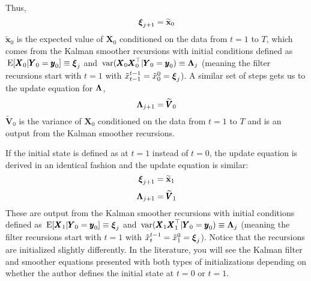 \documentclass[]{article}
\def\xixi{\mbox{\boldmath $\xi$}}
\def\LAM{\mbox{\boldmath $\Lambda$}}
\def\VV{\mbox{$\pmb{V}$}}	\def\vv{\mbox{$\pmb{v}$}}
\def\XX{\mbox{$\pmb{X}$}}	\def\xx{\mbox{$\pmb{x}$}}
\def\YY{\mbox{$\pmb{Y}$}}	\def\yy{\mbox{$\pmb{y}$}}
\def\E{\,\textup{\textrm{E}}}
\def\var{\,\textup{\textrm{var}}}
\begin{document}
Thus,
\begin{equation}\label{eq:pi.update.unconstrained}
\xixi_{j+1} = \widetilde{\mbox{$\mathbf x$}}_0
\end{equation}
$\widetilde{\mbox{$\mathbf x$}}_0$ is the expected value of $\XX_0$ conditioned on the data from $t=1$ to $T$, which comes from the Kalman smoother recursions with initial conditions defined as $\E[\XX_0|\YY_0=\yy_0] \equiv \xixi_j$ and $\var(\XX_0 \XX_0^\top|\YY_0=\yy_0)\equiv \LAM_j$ (meaning the filter recursions start with $t=1$ with  $\tilde{x}_{t-1}^{t-1} = \tilde{x}_0^0 = \xixi_j$).
A similar set of steps gets us to the update equation for $\LAM$,
\begin{equation}\label{eq:V0.update.unconstrained}
\LAM_{j+1} = \widetilde{\VV}_0
\end{equation}
$\widetilde{\VV}_0$ is the variance of $\XX_0$ conditioned on the data from $t=1$ to $T$ and is an output from the Kalman smoother recursions.

If the initial state is defined as at $t=1$ instead of $t=0$, the update equation is derived in an identical fashion and the update equation is similar:
\begin{equation}\label{eq:pix1.update.unconstrained}
\xixi_{j+1} = \widetilde{\mbox{$\mathbf x$}}_1
\end{equation}
\begin{equation}
\LAM_{j+1} = \widetilde{\VV}_1
\end{equation}
These are output from the Kalman smoother recursions with initial conditions defined as $\E[\XX_1|\YY_0=\yy_0] \equiv \xixi_j$ and $\var(\XX_1 \XX_1^\top|\YY_0=\yy_0)\equiv \LAM_j$  (meaning the filter recursions start with $t=1$ with  $\tilde{x}_{t}^{t-1} = \tilde{x}_1^0 = \xixi_j$).  Notice that the recursions are initialized slightly differently. In the literature, you will see the Kalman filter and smoother equations presented with both types of initializations depending on whether the author defines the initial state at $t=0$ or $t=1$.
\end{document}
